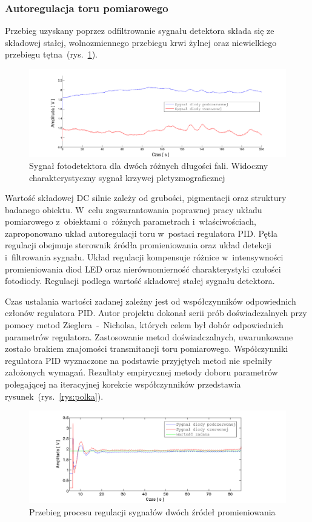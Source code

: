 \subsubsection{Autoregulacja toru pomiarowego}
\label{sec:PID}

Przebieg uzyskany poprzez odfiltrowanie sygnału detektora składa się ze składowej stałej, wolnozmiennego przebiegu krwi żylnej oraz niewielkiego 
przebiegu tętna~(rys.~\ref{rys:calib1}). 
\begin{figure}[ht]
	\centerline{\includegraphics[scale = 0.38]{graphic/calib1}}
	\caption{Sygnał fotodetektora dla dwóch różnych długości fali. Widoczny charakterystyczny sygnał krzywej pletyzmograficznej}
	\label{rys:calib1}
\end{figure}

Wartość składowej DC silnie zależy od grubości, pigmentacji oraz struktury badanego obiektu. W~celu zagwarantowania poprawnej pracy układu 
pomiarowego z~obiektami o~różnych parametrach i~właściwościach, zaproponowano układ autoregulacji toru w~postaci regulatora PID. Pętla 
regulacji obejmuje sterownik źródła promieniowania oraz układ detekcji i~filtrowania sygnału. Układ regulacji kompensuje różnice w~intensywności 
promieniowania diod LED oraz nierównomierność charakterystyki czułości fotodiody. Regulacji podlega wartość składowej stałej sygnału detektora. 

Czas ustalania wartości zadanej zależny jest od współczynników odpowiednich członów regulatora PID. Autor projektu dokonał serii
prób doświadczalnych przy pomocy metod Zieglera~-~Nicholsa, których celem był dobór odpowiednich parametrów regulatora. Zastosowanie metod doświadczalnych,
uwarunkowane zostało brakiem znajomości transmitancji toru pomiarowego. 
Współczynniki regulatora PID wyznaczone na podstawie przyjętych metod nie spełniły założonych wymagań. Rezultaty empirycznej metody doboru parametrów
polegającej na iteracyjnej korekcie współczynników przedstawia rysunek~(rys.~\ref{rys:polka}).
\begin{figure}[ht]
	\centerline{\includegraphics[scale = 0.58]{graphic/pid2}}
	\caption{Przebieg procesu regulacji sygnałów dwóch źródeł promieniowania}
	\label{rys:pid2}
\end{figure}

